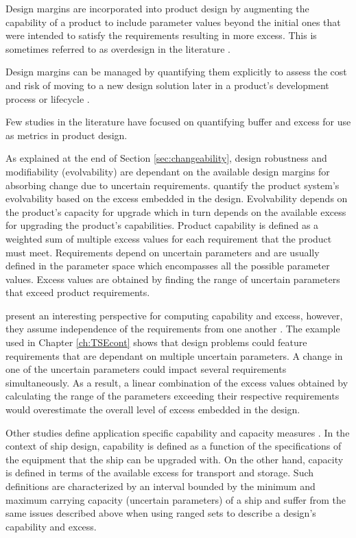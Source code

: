 Design margins are incorporated into product design by augmenting the capability of a product to include parameter values beyond the initial ones that were intended to satisfy the requirements resulting in more excess. This is sometimes referred to as overdesign in the literature \cite{Eckert2019}.

Design margins can be managed by quantifying them explicitly to assess the cost and risk of moving to a new design solution later in a product's development process or lifecycle \cite{Eckert2019}.

Few studies in the literature have focused on quantifying buffer and excess for use as metrics in product design.

As explained at the end of Section \ref{sec:changeability}, design robustness and modifiability (evolvability) are dependant on the available design margins for absorbing change due to uncertain requirements. \citeauthor{Tackett2014} quantify the product system's evolvability based on the excess embedded in the design. Evolvability depends on the product's capacity for upgrade which in turn depends on the available excess for upgrading the product's capabilities. Product capability is defined as a weighted sum of multiple excess values for each requirement that the product must meet. Requirements depend on uncertain parameters and are usually defined in the parameter space which encompasses all the possible parameter values. Excess values are obtained by finding the range of uncertain parameters that exceed product requirements.

\citeauthor{Tackett2014} present an interesting perspective for computing capability and excess, however, they assume independence of the requirements from one another \cite{Tackett2014}. The example used in Chapter \ref{ch:TSEcont} shows that design problems could feature requirements that are dependant on multiple uncertain parameters. A change in one of the uncertain parameters could impact several requirements simultaneously. As a result, a linear combination of the excess values obtained by calculating the range of the parameters exceeding their respective requirements would overestimate the overall level of excess embedded in the design.

Other studies define application specific capability and capacity measures \cite{Rehn2018}. In the context of ship design, capability is defined as a function of the specifications of the equipment that the ship can be upgraded with. On the other hand, capacity is defined in terms of the available excess for transport and storage. Such definitions are characterized by an interval bounded by the minimum and maximum carrying capacity (uncertain parameters) of a ship and suffer from the same issues described above when using ranged sets to describe a design's capability and excess.

